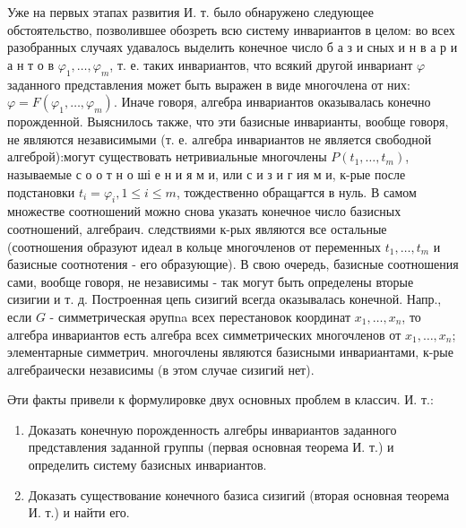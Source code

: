 \documentclass[10pt]{article}
\begin{document}
Уже на первых этапах развития И. т. было обнаружено следующее обстоятельство, позволившее обозреть всю систему инвариантов в целом: во всех разобранных случаях удавалось выделить конечное число б а з и сных и н в а р и а н т о в $\varphi_{1}, \ldots, \varphi_{m}$, т. е. таких инвариантов, что всякий другой инвариант $\varphi$ заданного представления может быть выражен в виде многочлена от них: $\varphi=F\left(\varphi_{1}, \ldots, \varphi_{m}\right)$. Иначе говоря, алгебра инвариантов оказывалась конечно порожденной. Выяснилось также, что эти базисные инварианты, вообще говоря, не являются независимыми (т. е. алгебра инвариантов не является свободной алгеброй):могут существовать нетривиальные многочлены $P\left(t_{1}, \ldots, t_{m}\right)$, называемые с о о т н о ші е н и я м и, или с и з и г ия м и, к-рые после подстановки $t_{i}=\varphi_{i}, 1 \leqslant i \leqslant m$, тождественно обращағтся в нуль. В самом множестве соотношений можно снова указать конечное число базисных соотношений, алгебраич. следствиями к-рых являются все остальные (соотношения образуют идеал в кольце многочленов от переменных $t_{1}, \ldots, t_{m}$ и базисные соотнотения - его образующие). В свою очередь, базисные соотношения сами, вообще говоря, не независимы - так могут быть определены вторые сизигии и т. д. Построенная цепь сизигий всегда оказывалась конечной. Напр., если $G$ - симметрическая әрупna всех перестановок координат $x_{1}, \ldots, x_{n}$, то алгебра инвариантов есть алгебра всех симметрических многочленов от $x_{1}, \ldots, x_{n}$; элементарные симметрич. многочлены являются базисными инвариантами, к-рые алгебраически независимы (в этом случае сизигий нет).



Әти факты привели к формулировке двух основных проблем в классич. И. т.:



\begin{enumerate}

  \item Доказать конечную порожденность алгебры инвариантов заданного представления заданной группы (первая основная теорема И. т.) и определить систему базисных инвариантов.



  \item Доказать существование конечного базиса сизигий (вторая основная теорема И. т.) и найти его.



\end{enumerate}
\end{document}
